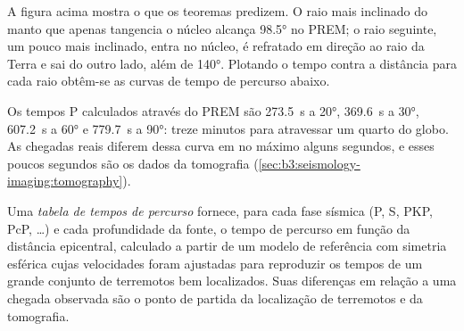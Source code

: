 \begin{omfigure}
\par{}
\label{fig:b3:seismology-imaging:rays}
\end{omfigure}

A figura acima mostra o que os teoremas predizem. O raio mais inclinado do manto que apenas
tangencia o núcleo alcança \ang{98.5} no PREM; o raio seguinte, um pouco mais inclinado,
entra no núcleo, é refratado em direção ao raio da Terra e sai do outro lado,
além de \ang{140}. Plotando o tempo contra a distância para cada raio obtêm-se as
curvas de tempo de percurso abaixo.

Os tempos P calculados através do PREM são \qty{273.5}{s} a \ang{20},
\qty{369.6}{s} a \ang{30}, \qty{607.2}{s} a \ang{60} e \qty{779.7}{s} a
\ang{90}: treze minutos para atravessar um quarto do globo.
As chegadas reais diferem dessa curva em no máximo alguns segundos, e esses poucos
segundos são os dados da tomografia (\cref{sec:b3:seismology-imaging:tomography}).

\begin{definition}\label{def:b3:seismology-imaging:tables}
Uma \emph{tabela de tempos de percurso} fornece, para cada
fase sísmica (P, S, PKP, PcP, \dots) e cada profundidade da fonte, o tempo de percurso em
função da distância epicentral, calculado a partir de um modelo de referência com simetria
esférica cujas velocidades foram ajustadas para reproduzir os tempos de um
grande conjunto de terremotos bem localizados. Suas diferenças em relação a uma
chegada observada são o ponto de partida da localização de terremotos e da tomografia.
\end{definition}

